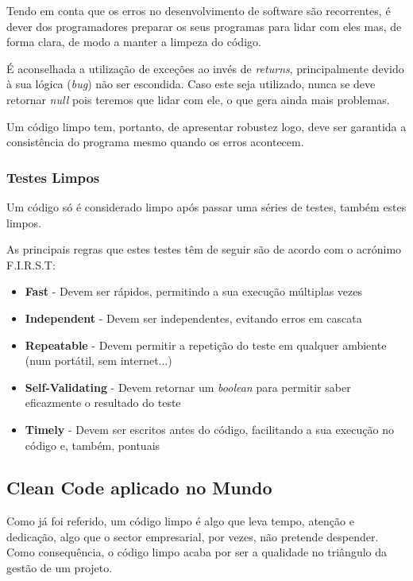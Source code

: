 \documentclass[10pt,portuguese]{article}
\begin{document}
\Par Tendo em conta que os erros no desenvolvimento de software são recorrentes, é dever dos programadores preparar os seus programas para lidar com eles mas, de forma clara, de modo a manter a limpeza do código.

\Par É aconselhada a utilização de exceções ao invés de \textit{returns}, principalmente devido à sua lógica (\textit{bug}) não ser escondida. Caso este seja utilizado, nunca se deve retornar \textit{null} pois teremos que lidar com ele, o que gera ainda mais problemas. 

\par Um código limpo tem, portanto, de apresentar robustez logo, deve ser garantida a consistência do programa mesmo quando os erros acontecem.

\subsubsection{Testes Limpos}

\Par Um código só é considerado limpo após passar uma séries de testes, também estes limpos.

\Par As principais regras que estes testes têm de seguir são de acordo com o acrónimo F.I.R.S.T:

\begin{itemize}
    \item \textbf{Fast} - Devem ser rápidos, permitindo a sua execução múltiplas vezes
    \item \textbf{Independent} - Devem ser independentes, evitando erros em cascata
    \item \textbf{Repeatable} - Devem permitir a repetição do teste em qualquer ambiente (num portátil, sem internet...)
    \item \textbf{Self-Validating} - Devem retornar um \textit{boolean} para permitir saber eficazmente o resultado do teste
    \item \textbf{Timely} - Devem ser escritos antes do código, facilitando a sua execução no código e, também, pontuais
\end{itemize}

\clearpage

\subsection{Clean Code aplicado no Mundo}

\Par Como já foi referido, um código limpo é algo que leva tempo, atenção e dedicação, algo que o sector empresarial, por vezes, não pretende despender. Como consequência, o código limpo acaba por ser a qualidade no triângulo da gestão de um projeto.
\end{document}
